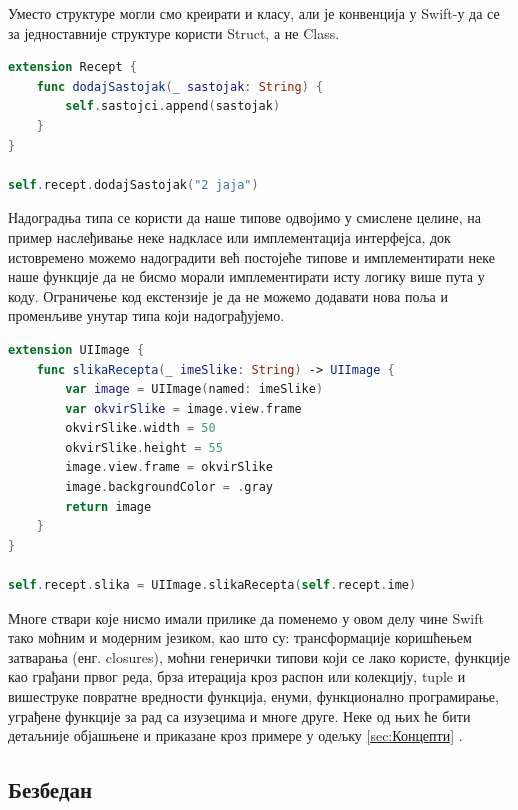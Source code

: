 \documentclass[12pt,oneside]{memoir}
\begin{document}
\indent Уместо структуре могли смо креирати и класу, али је конвенција у Swift-у да се за једноставније структуре користи Struct, а не Class.

\begin{lstlisting}[caption=\textit{{Надоградња постојећег типа (класе, структуре)}}, label={lst:Надоградња}, language=Swift, frame=single]
extension Recept {
    func dodajSastojak(_ sastojak: String) {
        self.sastojci.append(sastojak)
    }
}

self.recept.dodajSastojak("2 jaja")

\end{lstlisting}

\indent Надоградња типа се користи да наше типове одвојимо у смислене целине, на пример наслеђивање неке надкласе или имплементација интерфејса, док истовремено можемо надоградити већ постојеће типове и имплементирати неке наше функције да не бисмо морали имплементирати исту логику више пута у коду. Ограничење код екстензије је да не можемо додавати нова поља и променљиве унутар типа који надограђујемо.

\newpage %

\begin{lstlisting}[caption=\textit{{Надоградња Swift класе}}, label={lst:Надоградња Swift класе}, language=Swift, frame=single]
extension UIImage {
    func slikaRecepta(_ imeSlike: String) -> UIImage {
        var image = UIImage(named: imeSlike)
        var okvirSlike = image.view.frame
        okvirSlike.width = 50
        okvirSlike.height = 55
        image.view.frame = okvirSlike
        image.backgroundColor = .gray
        return image
    }
}

self.recept.slika = UIImage.slikaRecepta(self.recept.ime)

\end{lstlisting}

\indent Многе ствари које нисмо имали прилике да поменемо у овом делу чине Swift тако моћним и модерним језиком, као што су: трансформације коришћењем затварања (енг. closures), моћни генерички типови који се лако користе, функције као грађани првог реда, брза итерација кроз распон или колекцију, tuple и вишеструке повратне вредности функција, енуми, функционално програмирање, уграђене функције за рад са изузецима и многе друге. Неке од њих ће бити детаљније објашњене и приказане кроз примере у одељку \ref{sec:Концепти} \cite{The_Swift_Programming_Language}.

\subsection{Безбедан}
\end{document}
